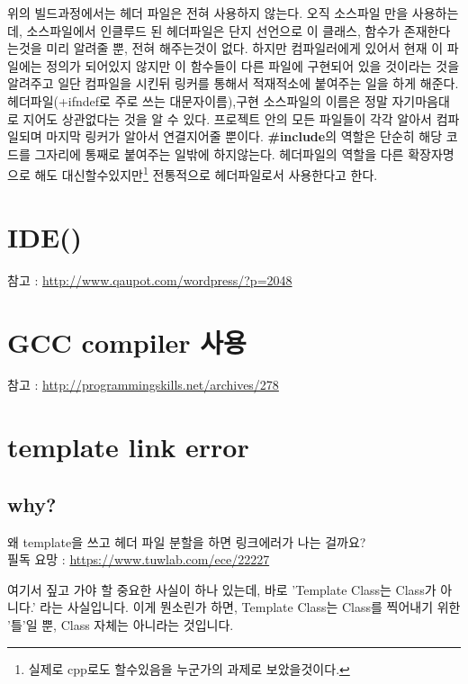 \documentclass{oblivoir}
\begin{document}
위의 빌드과정에서는 헤더 파일은 전혀 사용하지 않는다. 오직 소스파일 만을 사용하는데, 소스파일에서 인클루드 된 헤더파일은 단지 선언으로 이 클래스, 함수가 존재한다는것을 미리 알려줄 뿐, 전혀 해주는것이 없다. 하지만 컴파일러에게 있어서 현재 이 파일에는 정의가 되어있지 않지만 이 함수들이 다른 파일에 구현되어 있을 것이라는 것을 알려주고 일단 컴파일을 시킨뒤 링커를 통해서 적재적소에 붙여주는 일을 하게 해준다. 헤더파일(+ifndef로 주로 쓰는 대문자이름),구현 소스파일의 이름은 정말 자기마음대로 지어도 상관없다는 것을 알 수 있다. 프로젝트 안의 모든 파일들이 각각 알아서 컴파일되며 마지막 링커가 알아서 연결지어줄 뿐이다. \textbf{\#include}의 역할은 단순히 해당 코드를 그자리에 통째로 붙여주는 일밖에 하지않는다. 헤더파일의 역할을 다른 확장자명으로 해도 대신할수있지만\footnote{실제로 cpp로도 할수있음을 누군가의 과제로 보았을것이다.} 전통적으로 헤더파일로서 사용한다고 한다. 





\section{IDE()}
참고 : \url{http://www.qaupot.com/wordpress/?p=2048}







\section{ GCC compiler 사용}
참고 : \url{http://programmingskills.net/archives/278}






\section{template link error}
\subsection{why?}
왜 template을 쓰고 헤더 파일 분할을 하면 링크에러가 나는 걸까요?\\
필독 요망 : \url{https://www.tuwlab.com/ece/22227} \par

여기서 짚고 가야 할 중요한 사실이 하나 있는데, 바로 'Template Class는 Class가 아니다.' 라는 사실입니다. 이게 뭔소린가 하면, Template Class는 Class를 찍어내기 위한 '틀'일 뿐, Class 자체는 아니라는 것입니다.\par
\end{document}
